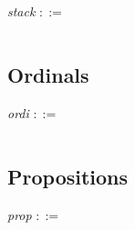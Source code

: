 \noindent \emph{stack} $::=$

\def\w{9.2cm}
\begin{tabular}{rll}
\end{tabular}

\subsection{Ordinals}

\noindent \emph{ordi} $::=$

\def\w{9.2cm}
\begin{tabular}{rll}
\end{tabular}

\subsection{Propositions}

\noindent \emph{prop} $::=$

